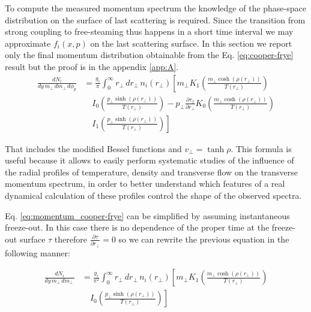 \documentclass[12pt,a4paper]{book}
\begin{document}
	To compute the measured momentum spectrum the knowledge of the phase-space distribution on the surface of last scattering is required. Since the transition from strong coupling to free-steaming thus happens in a short time interval we may approximate $f_i(x, p)$ on the last scattering surface. In this section we report only the final momentum distribution obtainable from the Eq. \ref{eq:cooper-frye} result but the proof is in the appendix \ref{app:A}.
	\begin{equation}
		\begin{aligned}
			\frac{dN_i}{dy \, m_\perp \, dm_\perp \, d\phi_p} &= \frac{g_i}{\pi} \int_{0}^{\infty} r_\perp \, dr_\perp \, n_i(r_\perp) \left[ m_\perp K_1 \left( \frac{m_\perp \cosh(\rho(r_\perp))}{T(r_\perp)}\right) \right. \\
			& \quad \left. I_0 \left( \frac{p_\perp \sinh(\rho(r_\perp))}{T(r_\perp)} \right) - p_\perp \frac{\partial \tau_f}{\partial r_\perp} K_0 \left( \frac{m_\perp \cosh(\rho(r_\perp))}{T(r_\perp)}\right) \right. \\
			& \quad \left. I_1 \left( \frac{p_\perp \sinh(\rho(r_\perp))}{T(r_\perp)} \right) \right]
		\end{aligned}
		\label{eq:momentum_cooper-frye}
	\end{equation}
	
	That includes the modified Bessel functions and $v_\perp= \tanh \rho$. This formula is useful because it allows to easily perform systematic studies of the influence of the radial profiles of temperature, density and transverse flow on the transverse momentum spectrum, in order to better understand which features of a real dynamical calculation of these profiles control the shape of the observed spectra.
	
	Eq. \ref{eq:momentum_cooper-frye} can be simplified by assuming instantaneous freeze-out. In this case there is no dependence of the proper time at the freeze-out surface $\tau$ therefore $\frac{\partial \tau}{\partial r_\perp}=0$ so we can rewrite the previous equation in the following manner:
	
	\begin{equation}
		\begin{aligned}
			\frac{dN_i}{dy \, m_\perp \, dm_\perp \,} &= \frac{g_i}{\pi^2} \int_{0}^{\infty} r_\perp \, dr_\perp \, n_i(r_\perp) \left[ m_\perp K_1 \left( \frac{m_\perp \cosh(\rho(r_\perp))}{T(r_\perp)} \right) \right. \\
			&\quad \left. I_0 \left( \frac{p_\perp \sinh(\rho(r_\perp))}{T(r_\perp)} \right) \right]
		\end{aligned}
		\label{eq:BG_blast_wave}
	\end{equation}
	
\end{document}
